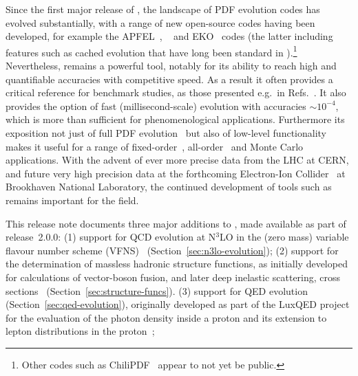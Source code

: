\documentclass[preprint,1p,a4paper,11pt]{elsarticle}
\begin{document}
Since the first major release of \hoppet, the landscape of PDF
evolution codes has evolved substantially, with a range of new open-source
codes having been developed, for example the APFEL~\cite{Bertone:2013vaa}, \APFELPP{}~\cite{Bertone:2017gds} and EKO~\cite{Candido:2022tld}
codes (the latter including
features such as cached evolution that have long been standard in
\hoppet).\footnote{Other codes such as ChiliPDF~\cite{Diehl:2021gvs}
  appear to not yet be public.}
%
Nevertheless, \hoppet remains a powerful tool, notably for its ability
to reach high and quantifiable accuracies with competitive speed.
%
As a result it often provides a critical reference for benchmark
studies, as those presented e.g.\ in
Refs.~\cite{Dittmar:2005ed,Bertone:2024dpm}.
%
It also provides the option of fast (millisecond-scale) evolution with
accuracies $\sim 10^{-4}$, which is more than sufficient for
phenomenological applications.
%
%
Furthermore its exposition not just of full PDF
evolution~\cite{Lai:2010vv,Gao:2013xoa,Butterworth:2015oua,PDF4LHCWorkingGroup:2022cjn}
but also of low-level functionality makes it useful for a range of
fixed-order~\cite{Caola:2019nzf,Asteriadis:2019dte,Bargiela:2022dla},
all-order~\cite{Banfi:2010xy,Dasgupta:2014yra,Banfi:2015pju,Monni:2016ktx,Bizon:2017rah,Buonocore:2024xmy}
and Monte
Carlo~\cite{Monni:2019whf,vanBeekveld:2023ivn,Buonocore:2024pdv,vanBeekveld:2025lpz}
applications.
%
With the advent of ever more precise data from the LHC at CERN, and
future very high precision data at the forthcoming Electron-Ion
Collider~\cite{AbdulKhalek:2021gbh} at Brookhaven National Laboratory,
the continued development of tools such as \hoppet remains important
for the field.

This release note documents three major additions to \hoppet, made
available as part of release~2.0.0: 
%
(1) support for QCD evolution at N$^3$LO in the (zero mass) variable
flavour number scheme (VFNS)~\cite{Buza:1996wv} (Section~\ref{sec:n3lo-evolution});
%
(2) support for the
determination of massless hadronic structure functions, as initially developed
for calculations of vector-boson fusion, and later deep inelastic scattering, cross
sections~\cite{Cacciari:2015jma,Dreyer:2016oyx,Dreyer:2018qbw,Dreyer:2018rfu,Karlberg:2024hnl}
(Section~\ref{sec:structure-funcs}).
%
(3) support for QED evolution (Section~\ref{sec:qed-evolution}),
originally developed as part of the LuxQED project for the evaluation
of the photon density inside a proton and its extension to lepton
distributions in the
proton~\cite{Manohar:2016nzj,Manohar:2017eqh,Buonocore:2020nai,Buonocore:2021bsf};
\end{document}
